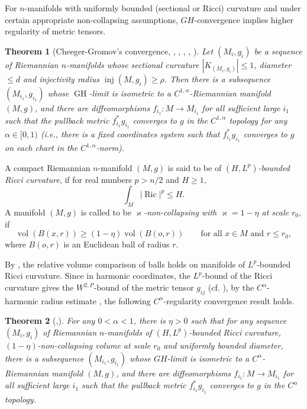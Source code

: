 \documentclass{amsart}
\numberwithin{equation}{section}
\newtheorem{theo}{Theorem}[section]
\theoremstyle{remark}
\renewcommand{\(}{\left(}
\renewcommand{\)}{\right)}
\renewcommand{\~}{\tilde}
\renewcommand{\-}{\overline}
\newcommand{\inj}{\operatorname{inj}}
\begin{document}
For $n$-manifolds with uniformly bounded (sectional or Ricci) curvature and under certain appropriate non-collapsing assumptions, $GH$-convergence implies higher regularity of metric tensors.

\begin{theo}[Cheeger-Gromov's convergence, \cite{Cheegerphd,Cheeger1970}, \cite{GLP1981}, \cite{Kasue1989}, \cite{Green-Wu1988}, \cite{Peters1987}]\label{thm-ChGro-Convergence}
	Let $(M_i,g_i)$ be a sequence of Riemannian $n$-manifolds whose sectional curvature $|K_{(M_i,g_i)}|\le 1$, diameter $\le d$ and injectivity radius $\inj(M,g_i)\ge \rho$. Then there is a subsequence $(M_{i_1},g_{i_1})$ whose $\operatorname{GH}$-limit is isometric to a $C^{1,\alpha}$-Riemannian manifold $(M,g)$, and there are diffeomorphisms $f_{i_1}:M\to M_{i_1}$ for all sufficient large $i_1$ such that the pullback metric $f_{i_1}^*g_{i_1}$ converges to $g$ in the $C^{1,\alpha}$ topology for any $\alpha\in [0,1)$ (i.e., there is a fixed coordinates system such that $f_{i_1}^*g_{i_1}$ converges to $g$ on each chart in the $C^{1,\alpha}$-norm).
\end{theo}

A compact Riemannian $n$-manifold $(M,g)$ is said to be of {\em $(H,L^p)$-bounded Ricci curvature}, if for real numbers $p>n/2$ and $H\ge 1$,
$$\int_M |\operatorname{Ric}|^p\le H.$$
A manifold $(M,g)$ is called to be  \emph{$\varkappa$-non-collapsing with $\varkappa=1-\eta$ at scale $r_0$}, if
$$\operatorname{vol}(B(x, r))\ge (1-\eta)\operatorname{vol}(B(o,r))\qquad  \text{for all $x\in M$ and $r \le r_0$},$$
where $B(o,r)$ is an Euclidean ball of radius $r$.

By \cite{Petersen-Wei1997}, the relative volume comparison of balls holds on manifolds of $L^p$-bounded Ricci curvature. Since in harmonic coordinates, the $L^p$-bound of the Ricci curvature gives the $W^{2,P}$-bound of the metric tensor $g_{ij}$ (cf. \cite{Anderson1990}), by the $C^{\alpha}$-harmonic radius estimate \cite[Theorem 2.35]{Tian-Zhang2016},  the following $C^{\alpha}$-regularity convergence result holds.
\begin{theo}[\cite{Tian-Zhang2016},\cite{Petersen-Wei1997}]\label{thm-Calpha-convergence}
	For any $0<\alpha<1$, there is $\eta>0$ such that for any sequence $(M_i,g_i)$ of Riemannian $n$-manifolds of
	$(H,L^p)$-bounded Ricci curvature, $(1-\eta)$-non-collapsing volume at scale $r_0$ and uniformly bounded diameter, there is a subsequence $(M_{i_1},g_{i_1})$ whose $GH$-limit is isometric to a $C^{\alpha}$-Riemannian manifold $(M,g)$, and there are diffeomorphisms $f_{i_1}:M\to M_{i_1}$ for all sufficient large $i_1$ such that the pullback metric $f_{i_1}^*g_{i_1}$ converges to $g$ in the $C^{\alpha}$ topology.
\end{theo}
\end{document}
